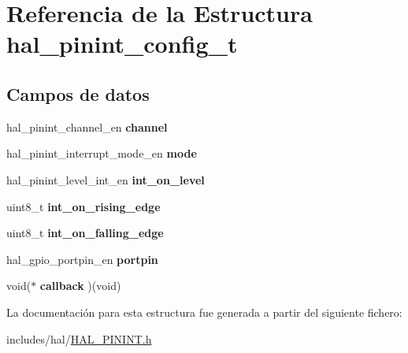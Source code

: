 \hypertarget{structhal__pinint__config__t}{}\section{Referencia de la Estructura hal\+\_\+pinint\+\_\+config\+\_\+t}
\label{structhal__pinint__config__t}
\subsection*{Campos de datos}
\begin{DoxyCompactItemize}
\item 
\mbox{\label{structhal__pinint__config__t_a4f9605d472459ec0f597bb9f24300ec9}} 
hal\+\_\+pinint\+\_\+channel\+\_\+en {\bfseries channel}
\item 
\mbox{\label{structhal__pinint__config__t_ade0605d3fbe6e6f79483a6a90abdac92}} 
hal\+\_\+pinint\+\_\+interrupt\+\_\+mode\+\_\+en {\bfseries mode}
\item 
\mbox{\label{structhal__pinint__config__t_a2b40a6838c99a20fa7f54201ce5cbf90}} 
hal\+\_\+pinint\+\_\+level\+\_\+int\+\_\+en {\bfseries int\+\_\+on\+\_\+level}
\item 
\mbox{\label{structhal__pinint__config__t_ac5652b8ba6a3b40c08032c502314b354}} 
uint8\+\_\+t {\bfseries int\+\_\+on\+\_\+rising\+\_\+edge}
\item 
\mbox{\label{structhal__pinint__config__t_a5781d117e9a60533a131727013825850}} 
uint8\+\_\+t {\bfseries int\+\_\+on\+\_\+falling\+\_\+edge}
\item 
\mbox{\label{structhal__pinint__config__t_afa9d7b9553e7aac4f835f4fd08484175}} 
hal\+\_\+gpio\+\_\+portpin\+\_\+en {\bfseries portpin}
\item 
\mbox{\label{structhal__pinint__config__t_a495e9813a55fc4fae296aa708c2c18c5}} 
void($\ast$ {\bfseries callback} )(void)
\end{DoxyCompactItemize}


La documentación para esta estructura fue generada a partir del siguiente fichero\+:\begin{DoxyCompactItemize}
\item 
includes/hal/\hyperlink{HAL__PININT_8h}{H\+A\+L\+\_\+\+P\+I\+N\+I\+N\+T.\+h}\end{DoxyCompactItemize}
